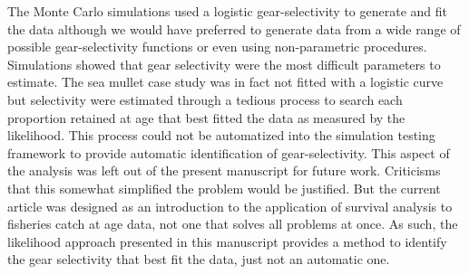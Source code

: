 \documentclass[12pt]{article}
\begin{document}

The Monte Carlo simulations used a logistic gear-selectivity to generate and fit the data although we would have preferred to generate data from a wide range of possible gear-selectivity functions or even using non-parametric procedures. Simulations showed that gear selectivity were the most difficult parameters to estimate. The sea mullet case study was in fact not fitted with a logistic curve but selectivity were estimated through a tedious process to search each proportion retained at age that best fitted the data as measured by the likelihood. This process could not be automatized into the simulation testing framework to provide automatic identification of gear-selectivity. This aspect of the analysis was left out of the present manuscript for future work. Criticisms that this somewhat simplified the problem would be justified. But the current article was designed as an introduction to the application of survival analysis to fisheries catch at age data, not one that solves all problems at once. As such, the likelihood approach presented in this manuscript provides a method to identify the gear selectivity that best fit the data, just not an automatic one. \\ 




\end{document}
